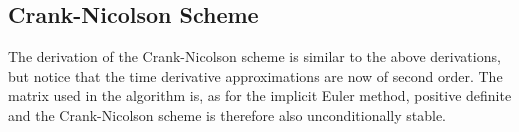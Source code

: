 \documentclass[aps,reprint]{revtex4-1}
\newcommand\blankpage{%
  \null
  \thispagestyle{empty}%
  \addtocounter{page}{-1}%
  \newpage}
\begin{document}
\subsection{Crank-Nicolson Scheme}
The derivation of the Crank-Nicolson scheme is similar to the above derivations,
but notice that the time derivative approximations are now of second order. The
matrix used in the algorithm is, as for the implicit Euler method, positive definite
and the Crank-Nicolson scheme is therefore also unconditionally stable.
\blankpage
\end{document}
